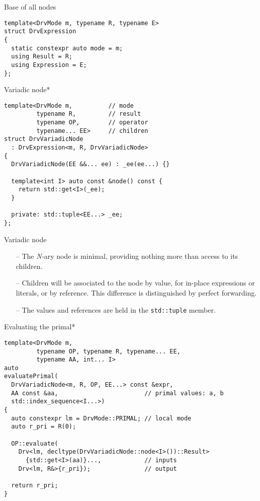 \documentclass[xcolor=dvipsnames]{beamer}
\begin{document}
\begin{frame}[fragile]{Base of all nodes}
\begin{lstlisting}
template<DrvMode m, typename R, typename E>
struct DrvExpression
{
  static constexpr auto mode = m;
  using Result = R;
  using Expression = E;
};
\end{lstlisting}
\end{frame}


\begin{frame}[fragile]{Variadic node*}
\begin{lstlisting}
template<DrvMode m,          // mode
         typename R,         // result
         typename OP,        // operator
         typename... EE>     // children
struct DrvVariadicNode
  : DrvExpression<m, R, DrvVariadicNode>
{
  DrvVariadicNode(EE &&... ee) : _ee(ee...) {}

  template<int I> auto const &node() const {
    return std::get<I>(_ee);
  }

  private: std::tuple<EE...> _ee;
};
\end{lstlisting}
\end{frame}


\begin{frame}[fragile]{Variadic node}
\begin{itemize}
\item[--] The \emph{N-}ary node is minimal, providing nothing more than access to its children.  \vspace{3mm}
\item[--] Children will be associated to the node by value, for in-place expressions or literals, or by reference. This difference is distinguished by perfect forwarding. \vspace{3mm}
\item[--] The values and references are held in the \texttt{std::tuple} member. \vspace{3mm}
\end{itemize}
\end{frame}


\begin{frame}[fragile]{Evaluating the primal*}
\begin{lstlisting}
template<DrvMode m,
         typename OP, typename R, typename... EE,
         typename AA, int... I>
auto
evaluatePrimal(
  DrvVariadicNode<m, R, OP, EE...> const &expr,
  AA const &aa,                        // primal values: a, b
  std::index_sequence<I...>)
{
  auto constexpr lm = DrvMode::PRIMAL; // local mode
  auto r_pri = R(0);
  
  OP::evaluate(
    Drv<lm, decltype(DrvVariadicNode::node<I>())::Result>
      {std::get<I>(aa)}...,            // inputs
    Drv<lm, R&>{r_pri});               // output
    
  return r_pri;
}
\end{lstlisting}
\end{frame}
\end{document}

